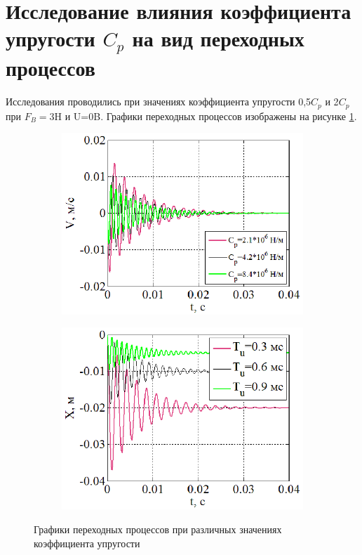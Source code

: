 \documentclass[a4paper,12pt]{article} %
\begin{document}
\section{Исследование влияния коэффициента упругости $C_p$ на вид переходных процессов}
Исследования проводились при значениях коэффициента упругости 0,5$C_p$ и 2$C_p$ при $F_B=3$H и U=0B. Графики переходных процессов изображены на рисунке \ref{VX3}.
\begin{figure}[H]
	\centering
	\begin{subfigure}[b]{0.48\textwidth}
	    \includegraphics[width = \textwidth]{scheme/V3}
	\end{subfigure}
	\hfill
	\begin{subfigure}[b]{0.48\textwidth}
		\includegraphics[width = \textwidth]{scheme/X3}
	\end{subfigure}
	\caption{Графики переходных процессов при различных значениях коэффициента упругости}
	\label{VX3}
\end{figure}
\end{document}
